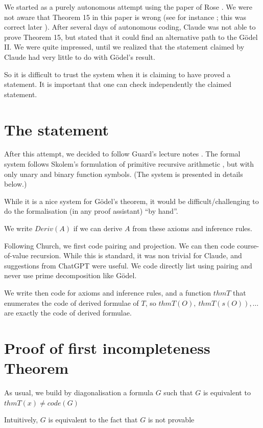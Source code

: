 \documentclass[11pt]{article}
\theoremstyle{plain}
\theoremstyle{definition}
\theoremstyle{remark}
\begin{document}
 We started as a purely autonomous attempt using the paper of Rose \cite{Rose61}.
 We were not aware that Theorem 15 in this paper is wrong (see for instance \cite{Cook75}; this was
 correct later \cite{Rose67}).
After several days of autonomous coding, Claude was not able to prove Theorem 15,
but stated that it could find an alternative path to the G\"odel II.
We were quite impressed, until we realized that the statement claimed by Claude had very
little to do with G\"odel's result.

So it is difficult to trust the system when it is claiming to have proved a statement. It is
important that one can check independently the claimed statement.

\section{The statement}

After this attempt, we decided to follow Guard's lecture notes \cite{Guard63}. The formal system
follows Skolem's formulation of primitive recursive arithmetic \cite{Skolem23}, but with only
unary and binary function symbols. (The system is presented in details below.)

While it is a nice system for G\"odel's theorem, it would be difficult/challenging to do the formalisation
(in any proof assistant) ``by hand''.

We write $Deriv(A)$ if we can derive $A$ from these axioms and inference rules.

Following Church, we first code pairing and projection. We can then code course-of-value recursion.
While this is standard, it was non trivial for Claude, and suggestions from ChatGPT were useful.
We code directly list using pairing and never use prime decomposition like G\"odel.

We write then code for axioms and inference rules, and a function $thmT$ that enumerates the code of derived formulae
of $T$, so $thmT(O),~thmT(s(O)),\dots$ are exactly the code of derived formulae.

\section{Proof of first incompleteness Theorem}

As usual, we build by diagonalisation a formula $G$ such that $G$ is equivalent
to $thmT(x)\neq code(G)$

Intuitively, $G$ is equivalent to the fact that $G$ is not provable
\end{document}

